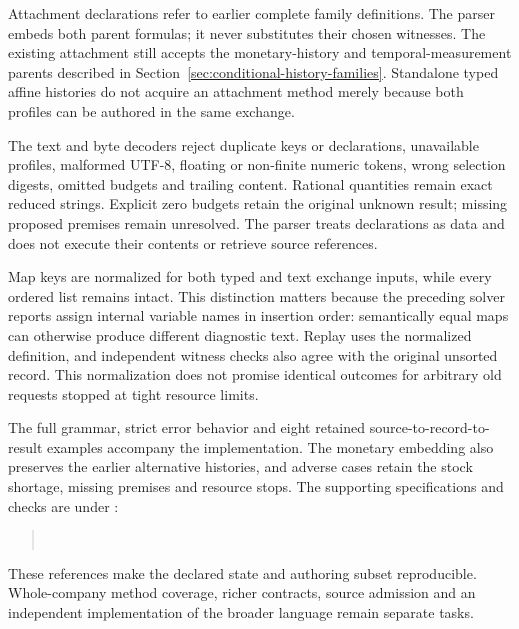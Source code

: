 Attachment declarations refer to earlier complete family definitions. The
parser embeds both parent formulas; it never substitutes their chosen witnesses.
The existing attachment still accepts the monetary-history and temporal-measurement
parents described in Section~\ref{sec:conditional-history-families}.
Standalone typed affine histories do not acquire an attachment method merely
because both profiles can be authored in the same exchange.

The text and byte decoders reject duplicate keys or declarations, unavailable
profiles, malformed UTF-8, floating or non-finite numeric tokens, wrong selection
digests, omitted budgets and trailing content. Rational quantities remain exact
reduced strings. Explicit zero budgets retain the original unknown result;
missing proposed premises remain unresolved. The parser treats declarations
as data and does not execute their contents or retrieve source references.

Map keys are normalized for both typed and text exchange inputs, while every
ordered list remains intact. This distinction matters because the preceding
solver reports assign internal variable names in insertion order: semantically
equal maps can otherwise produce different diagnostic text. Replay uses the
normalized definition, and independent witness checks also agree with the
original unsorted record. This normalization does not promise identical outcomes
for arbitrary old requests stopped at tight resource limits.

The full grammar, strict error behavior and eight retained source-to-record-to-result
examples accompany the implementation. The monetary embedding also preserves
the earlier alternative histories, and adverse cases retain the stock shortage,
missing premises and resource stops. The supporting specifications and checks
are under :
\begin{quote}\small
{}\\
\end{quote}
These references make the declared state and authoring subset reproducible.
Whole-company method coverage, richer contracts, source admission and an
independent implementation of the broader language remain separate tasks.
